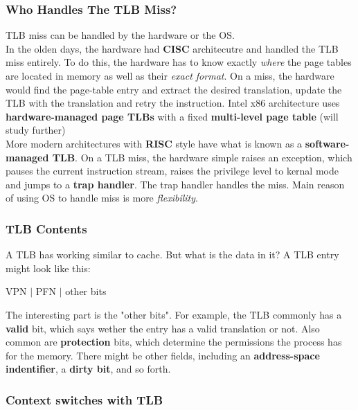 \subsubsection{Who Handles The TLB Miss?}

TLB miss can be handled by the hardware or the OS.\\

In the olden days, the hardware had \textbf{CISC} architecutre and handled the
TLB miss entirely. To do this, the hardware has to know exactly \textit{where}
the page tables are located in memory as well as their \textit{exact format}.
On a miss, the hardware would find the page-table entry and extract the
desired translation, update the TLB with the translation and retry the
instruction. Intel x86 architecture uses \textbf{hardware-managed page TLBs} 
with a fixed \textbf{multi-level page table} (will study further)\\

More modern architectures with \textbf{RISC} style have what is
known as a \textbf{software-managed TLB}. On a TLB miss, the hardware simple 
raises an exception, which pauses the current instruction stream, raises the
privilege level to kernal mode and jumps to a \textbf{trap handler}. The
trap handler handles the miss. Main reason of using OS to handle miss is 
more \textit{flexibility}.

\subsubsection{TLB Contents}

A TLB has working similar to cache. But what is the data in it? A TLB entry
might look like this:

\begin{center}
    VPN $|$ PFN $|$ other bits
\end{center}

The interesting part is the "other bits". For example, the TLB commonly has a
\textbf{valid} bit,  which says wether the entry has a valid translation or
not. Also common are \textbf{protection} bits, which determine the permissions
the process has for the memory. There might be other fields, including an
\textbf{address-space indentifier}, a \textbf{dirty bit}, and so forth.

\subsubsection{Context switches with TLB}

